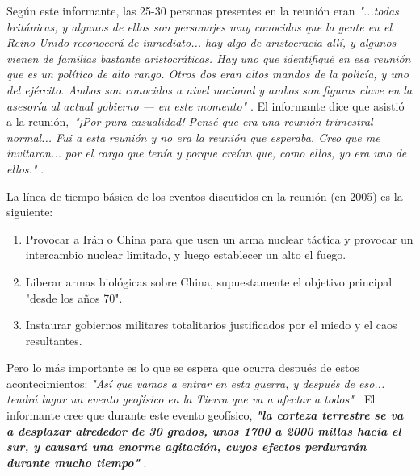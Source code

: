 \documentclass[10pt,twocolumn,letterpaper]{article}
\begin{document}
Según este informante, las 25-30 personas presentes en la reunión eran \textit{"...todas británicas, y algunos de ellos son personajes muy conocidos que la gente en el Reino Unido reconocerá de inmediato... hay algo de aristocracia allí, y algunos vienen de familias bastante aristocráticas. Hay uno que identifiqué en esa reunión que es un político de alto rango. Otros dos eran altos mandos de la policía, y uno del ejército. Ambos son conocidos a nivel nacional y ambos son figuras clave en la asesoría al actual gobierno — en este momento"} \cite{4}. El informante dice que asistió a la reunión,\ \textit{"¡Por pura casualidad! Pensé que era una reunión trimestral normal... Fui a esta reunión y no era la reunión que esperaba. Creo que me invitaron... por el cargo que tenía y porque creían que, como ellos, yo era uno de ellos."} \cite{4}.

La línea de tiempo básica de los eventos discutidos en la reunión (en 2005) es la siguiente:
\begin{flushleft}
\begin{enumerate}
    \item Provocar a Irán o China para que usen un arma nuclear táctica y provocar un intercambio nuclear limitado, y luego establecer un alto el fuego.
    \item Liberar armas biológicas sobre China, supuestamente el objetivo principal "desde los años 70".
    \item Instaurar gobiernos militares totalitarios justificados por el miedo y el caos resultantes.
\end{enumerate}
\end{flushleft}

Pero lo más importante es lo que se espera que ocurra después de estos acontecimientos: \textit{"Así que vamos a entrar en esta guerra, y después de eso... tendrá lugar un evento geofísico en la Tierra que va a afectar a todos"} \cite{4}. El informante cree que durante este evento geofísico, \textit{\textbf{"la corteza terrestre se va a desplazar alrededor de 30 grados, unos 1700 a 2000 millas hacia el sur, y causará una enorme agitación, cuyos efectos perdurarán durante mucho tiempo"}} \cite{4}.
\end{document}
